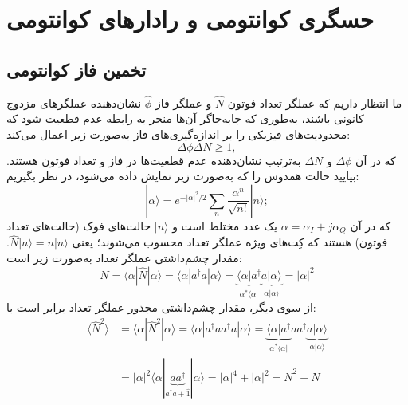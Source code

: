 \chapter{حسگری کوانتومی و رادارهای کوانتومی}
\label{chap:11}

\section{تخمین فاز کوانتومی}
\label{sec:11-1}

ما انتظار داریم که عملگر تعداد فوتون $\hat{N}$ و عملگر فاز $\hat{\phi}$ نشان‌دهنده عملگرهای مزدوج کانونی باشند، به‌طوری که جابه‌جاگر آن‌ها منجر به رابطه عدم قطعیت شود که محدودیت‌های فیزیکی را بر اندازه‌گیری‌های فاز به‌صورت زیر اعمال می‌کند:
\begin{equation}
	\Delta \phi \Delta N \geq 1,
	\label{eq:11-1}
\end{equation}
که در آن $\Delta \phi$ و $\Delta N$ به‌ترتیب نشان‌دهنده عدم قطعیت‌ها در فاز و تعداد فوتون هستند. بیایید حالت همدوس را که به‌صورت زیر نمایش داده می‌شود، در نظر بگیریم:
\begin{equation}
	|\alpha\rangle = e^{-|\alpha|^2/2} \sum_{n} \frac{\alpha^n}{\sqrt{n!}} |n\rangle;
	\label{eq:11-2}
\end{equation}
که در آن $\alpha = \alpha_I + j\alpha_Q$ یک عدد مختلط است و $|n\rangle$ حالت‌های فوک (حالت‌های تعداد فوتون) هستند که کِت‌های ویژه عملگر تعداد محسوب می‌شوند؛ یعنی $\hat{N}|n\rangle = n|n\rangle$. مقدار چشم‌داشتی عملگر تعداد به‌صورت زیر است:
\begin{equation}
	\bar{N} = \langle \alpha | \hat{N} | \alpha \rangle = \langle \alpha | a^\dagger a | \alpha \rangle = \underbrace{\langle \alpha | a^\dagger}_{\alpha^* \langle \alpha |} \underbrace{a | \alpha \rangle}_{\alpha | \alpha \rangle} = |\alpha|^2
	\label{eq:11-3}
\end{equation}
از سوی دیگر، مقدار چشم‌داشتی مجذور عملگر تعداد برابر است با:
\begin{equation}
	\begin{aligned}
		\langle \hat{N}^2 \rangle &= \langle \alpha | \hat{N}^2 | \alpha \rangle = \langle \alpha | a^\dagger a a^\dagger a | \alpha \rangle = \underbrace{\langle \alpha | a^\dagger}_{\alpha^* \langle \alpha |} a a^\dagger \underbrace{a | \alpha \rangle}_{\alpha | \alpha \rangle} \\
		&= |\alpha|^2 \langle \alpha | \underbrace{a a^\dagger}_{a^\dagger a + \hat{1}} | \alpha \rangle = |\alpha|^4 + |\alpha|^2 = \bar{N}^2 + \bar{N}
		\label{eq:11-4}
	\end{aligned}
\end{equation}
